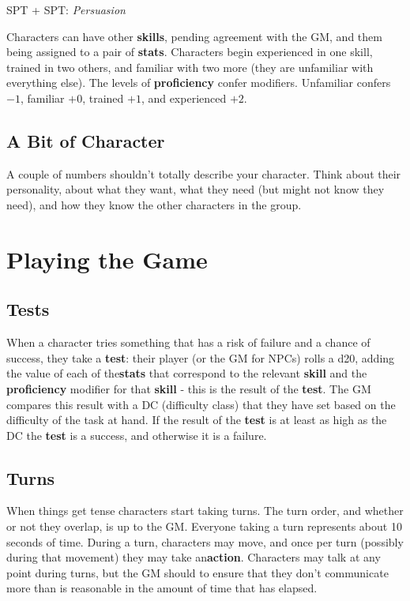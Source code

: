 \documentclass[11pt]{article}
\begin{document}
\begin{multicols}{3}
\begin{multicols}{2}
    SPT + SPT: ​\textit{Persuasion}
  \end{multicols}

  Characters can have other \textbf{skills}, pending agreement with the GM, and them being assigned to a pair of \textbf{stats}. Characters begin experienced in one skill, trained in two others, and familiar with two more (they are unfamiliar with everything else). The levels of \textbf{proficiency} confer modifiers. Unfamiliar confers $-1$, familiar $+0$, trained $+1$, and experienced $+2$.

  \subsection*{A Bit of Character}

  A couple of numbers shouldn't totally describe your character. Think about their personality, about what they want, what they need (but might not know they need), and how they know the other characters in the group.

  \section*{Playing the Game}

  \subsection*{Tests}

  When a character tries something that has a risk of failure and a chance of success, they take a \textbf{​test}​: their player (or the GM for NPCs) rolls a d20, adding the value of each of the ​\textbf{stats​} that correspond to the relevant \textbf{skill​} and the \textbf{​proficiency} modifier for that \textbf{​skill​} - this is the result of the \textbf{test}. The GM compares this result with a DC (difficulty class) that they have set based on the difficulty of the task at hand. If the result of the \textbf{test} is at least as high as the DC the \textbf{test} is a success, and otherwise it is a failure.

  \subsection*{Turns}

  When things get tense characters start taking turns. The turn order, and whether or not they overlap, is up to the GM. Everyone taking a turn represents about 10 seconds of time. During a turn, characters may move, and once per turn (possibly during that movement) they may take an ​\textbf{action​}. Characters may talk at any point during turns, but the GM should to ensure that they don’t communicate more than is reasonable in the amount of time that has elapsed.


\end{multicols}
\end{document}
